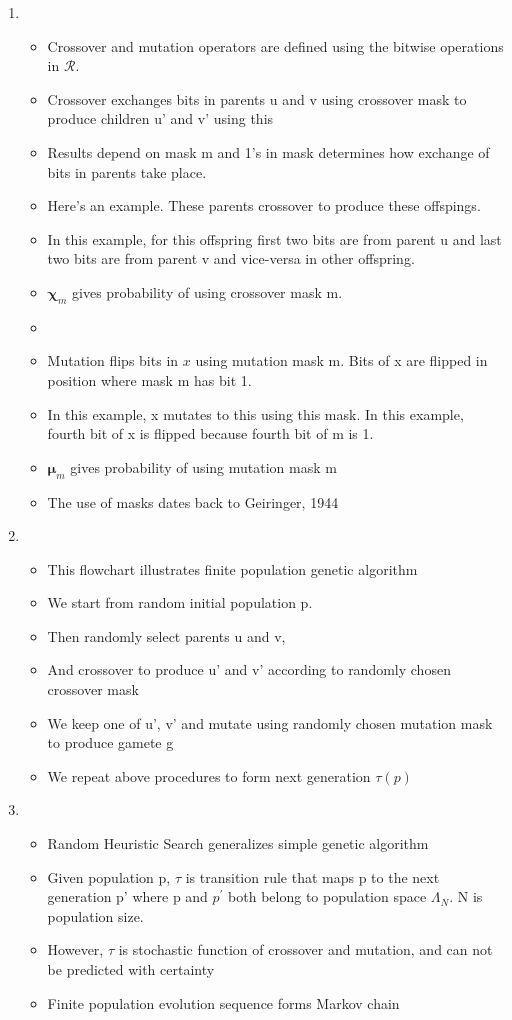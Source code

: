 \documentclass{article}
\begin{document}
\begin{enumerate}
\item
  \begin{itemize}
  \item Crossover and mutation operators are defined using the
    bitwise operations in $\mathcal{R}$.
  \item Crossover exchanges bits in parents u and v using crossover mask
  to produce children u' and v' using this
  \item Results depend on mask m and 1's in mask determines how exchange of bits in parents take place.
  \item Here's an example. These parents crossover to produce these offspings.
  \item In this example, for this offspring first two bits are from parent u and last two bits are from parent v and vice-versa in other offspring.
  \item $\bm{\chi}_m$ gives probability of using crossover mask m.
  \item
  \item Mutation flips bits in $x$ using mutation mask m. Bits of x are flipped in position where mask m has bit 1.
  \item In this example, x mutates to this using this mask. In this example, fourth bit of x is flipped because fourth bit of m is 1.
  \item $\bm{\mu}_m$ gives probability of using mutation mask m
  \item The use of masks dates back to Geiringer, 1944
  \end{itemize}
    
\item
  \begin{itemize}
  \item This flowchart illustrates finite population genetic algorithm
  \item We start from random initial population p.
  \item Then randomly select parents u and v, 
  \item And crossover to produce u' and v' according to randomly chosen crossover mask
  \item We keep one of u', v' and mutate using randomly chosen mutation mask to produce gamete g
  \item We repeat above procedures to form next generation $\tau(p)$
  \end{itemize}
  
\item
  \begin{itemize}
  \item Random Heuristic Search generalizes simple genetic algorithm
  \item Given population p, $\tau$ is transition rule that maps p to
    the next generation p' where p and $p^\prime$ both belong to population space $\Lambda_N$.
    N is population size. 
    \item However, $\tau$ is stochastic function of crossover and
    mutation, and can not be predicted with
    certainty 
  \item Finite population evolution sequence forms
    Markov chain
  

\end{itemize}
\end{enumerate}
\end{document}
